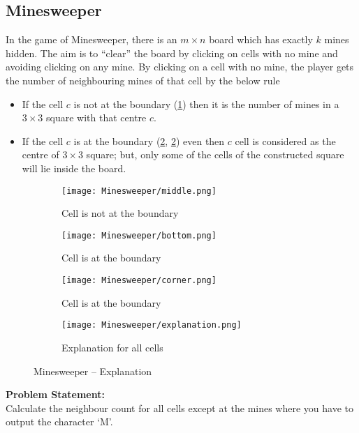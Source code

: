 \subsection{Minesweeper}
In the game of Minesweeper, there is an $m\times n$ board which has exactly $k$ mines hidden. The aim is to ``clear'' the board by clicking on cells with no mine and avoiding clicking on any mine. By clicking on a cell with no mine, the player gets the number of neighbouring mines of that cell by the below rule
\begin{itemize}	
	\item If the cell $c$ is not at the boundary (\ref{fig:minecnb}) then it is the number of mines in a $3\times3$ square with that centre $c$.
	\item If the cell $c$ is at the boundary (\ref{fig:minecb1}, \ref{fig:minecb1}) even then $c$ cell is considered as the centre of $3\times3$ square; but, only some of the cells of the constructed square will lie inside the board.
\end{itemize}
\begin{figure}[H]
	\centering
	\begin{subfigure}[t]{0.25\linewidth}
		\centering
		\texttt{[image: Minesweeper/middle.png]}
		\caption{Cell is not at the boundary}
		\label{fig:minecnb}
	\end{subfigure}
	\begin{subfigure}[t]{0.22\linewidth}
		\centering
		\texttt{[image: Minesweeper/bottom.png]}
		\caption{Cell is at the boundary}
		\label{fig:minecb1}
	\end{subfigure}
	\begin{subfigure}[t]{0.22\linewidth}
		\centering
		\texttt{[image: Minesweeper/corner.png]}
		\caption{Cell is at the boundary}
		\label{fig:minecb2}
	\end{subfigure}
	\begin{subfigure}[t]{0.22\linewidth}
		\centering
		\texttt{[image: Minesweeper/explanation.png]}
		\caption{Explanation for all cells}
		\label{fig:minee}
	\end{subfigure}
	\caption{Minesweeper -- Explanation}
\end{figure}
\vspace{-2em}
\textbf{Problem Statement:}\\
Calculate the neighbour count for all cells except at the mines where you have to output the character `M'.%
